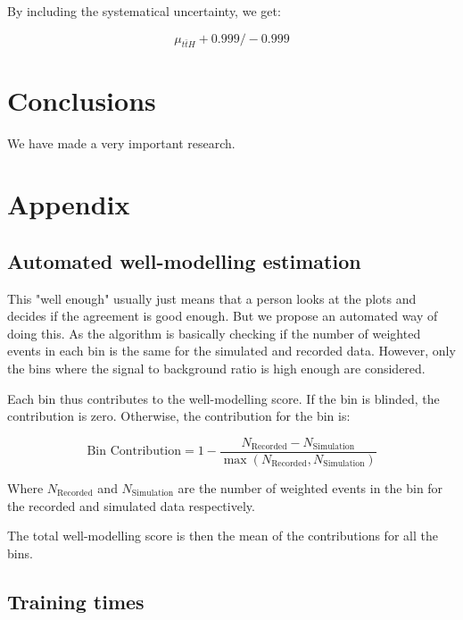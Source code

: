 \documentclass[twoside,draft,a4paper]{article}
\begin{document}
By including the systematical uncertainty, we get:

$$
    \mu_{t\bar{t}H} + 0.999 /-0.999
$$



\section{Conclusions}

We have made a very important research.



\section{Appendix}


\subsection{Automated well-modelling estimation}

This "well enough" usually just means that a person looks at the plots and decides if the agreement is good enough.
But we propose an automated way of doing this. As the algorithm is basically checking if the number of weighted events
in each bin is the same for the simulated and recorded data. However, only the bins where the signal to background ratio
is high enough are considered.

Each bin thus contributes to the well-modelling score. If the bin is blinded, the contribution is zero. Otherwise, the
contribution for the bin is:

$$
    \text{Bin Contribution} = 1 - \frac{N_\text{Recorded} - N_\text{Simulation}}{\max(N_\text{Recorded}, N_\text{Simulation})}
$$

Where $N_\text{Recorded}$ and $N_\text{Simulation}$ are the number of weighted events in the bin for the recorded and
simulated data respectively.

The total well-modelling score is then the mean of the contributions for all the bins.



\subsection{Training times}
\end{document}
